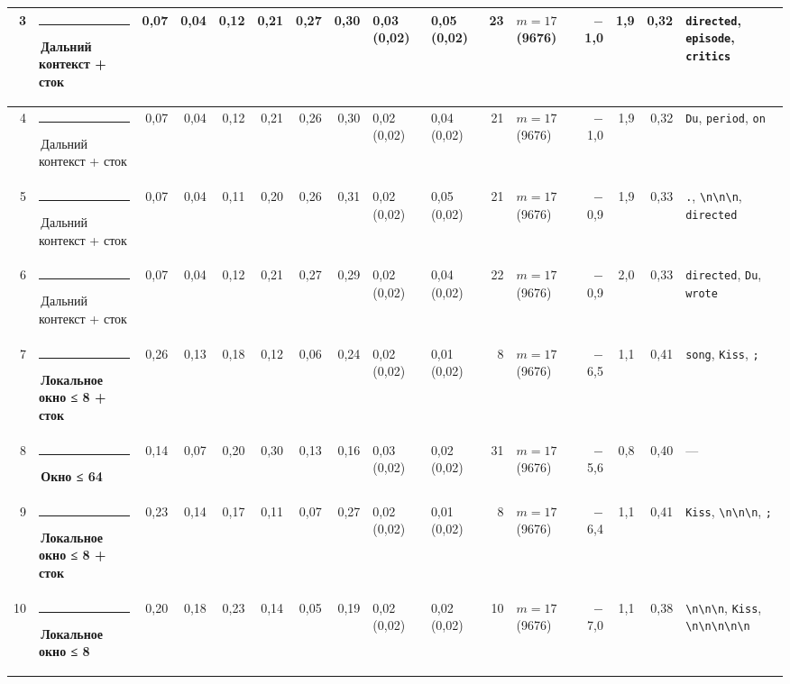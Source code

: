 \documentclass[10pt]{article}
\begin{document}
\begin{minipage}{\linewidth}
\begin{center}
{\begin{tabular}{|r|l|r|r|r|r|r|r|l|l|r|l|r|r|r|l|}
3 & \textcolor[HTML]{C3C2B7}{\rule{0.62em}{0.62em}}\,Дальний контекст + сток & 0,07 & 0,04 & 0,12 & 0,21 & 0,27 & 0,30 & 0,03 (0,02) & 0,05 (0,02) & 23 & $m{=}17$ (9676) & $-$1,0 & 1,9 & 0,32 & \texttt{\textvisiblespace{}directed}, \texttt{\textvisiblespace{}episode}, \texttt{\textvisiblespace{}critics} \\ \hline
4 & \textcolor[HTML]{C3C2B7}{\rule{0.62em}{0.62em}}\,Дальний контекст + сток & 0,07 & 0,04 & 0,12 & 0,21 & 0,26 & 0,30 & 0,02 (0,02) & 0,04 (0,02) & 21 & $m{=}17$ (9676) & $-$1,0 & 1,9 & 0,32 & \texttt{\textvisiblespace{}Du}, \texttt{\textvisiblespace{}period}, \texttt{\textvisiblespace{}on} \\ \hline
5 & \textcolor[HTML]{C3C2B7}{\rule{0.62em}{0.62em}}\,Дальний контекст + сток & 0,07 & 0,04 & 0,11 & 0,20 & 0,26 & 0,31 & 0,02 (0,02) & 0,05 (0,02) & 21 & $m{=}17$ (9676) & $-$0,9 & 1,9 & 0,33 & \texttt{\textvisiblespace{}.}, \texttt{\textvisiblespace{}\textbackslash{}n\textbackslash{}n\textbackslash{}n}, \texttt{\textvisiblespace{}directed} \\ \hline
6 & \textcolor[HTML]{C3C2B7}{\rule{0.62em}{0.62em}}\,Дальний контекст + сток & 0,07 & 0,04 & 0,12 & 0,21 & 0,27 & 0,29 & 0,02 (0,02) & 0,04 (0,02) & 22 & $m{=}17$ (9676) & $-$0,9 & 2,0 & 0,33 & \texttt{\textvisiblespace{}directed}, \texttt{\textvisiblespace{}Du}, \texttt{\textvisiblespace{}wrote} \\ \hline
7 & \textcolor[HTML]{1BAF7A}{\rule{0.62em}{0.62em}}\,\textbf{Локальное окно ≤ 8 + сток} & 0,26 & 0,13 & 0,18 & 0,12 & 0,06 & 0,24 & 0,02 (0,02) & 0,01 (0,02) & 8 & $m{=}17$ (9676) & $-$6,5 & 1,1 & 0,41 & \texttt{\textvisiblespace{}song}, \texttt{\textvisiblespace{}Kiss}, \texttt{\textvisiblespace{};} \\ \hline
8 & \textcolor[HTML]{EDA100}{\rule{0.62em}{0.62em}}\,\textbf{Окно ≤ 64} & 0,14 & 0,07 & 0,20 & 0,30 & 0,13 & 0,16 & 0,03 (0,02) & 0,02 (0,02) & 31 & $m{=}17$ (9676) & $-$5,6 & 0,8 & 0,40 & — \\ \hline
9 & \textcolor[HTML]{1BAF7A}{\rule{0.62em}{0.62em}}\,\textbf{Локальное окно ≤ 8 + сток} & 0,23 & 0,14 & 0,17 & 0,11 & 0,07 & 0,27 & 0,02 (0,02) & 0,01 (0,02) & 8 & $m{=}17$ (9676) & $-$6,4 & 1,1 & 0,41 & \texttt{\textvisiblespace{}Kiss}, \texttt{\textvisiblespace{}\textbackslash{}n\textbackslash{}n\textbackslash{}n}, \texttt{\textvisiblespace{};} \\ \hline
10 & \textcolor[HTML]{1BAF7A}{\rule{0.62em}{0.62em}}\,\textbf{Локальное окно ≤ 8} & 0,20 & 0,18 & 0,23 & 0,14 & 0,05 & 0,19 & 0,02 (0,02) & 0,02 (0,02) & 10 & $m{=}17$ (9676) & $-$7,0 & 1,1 & 0,38 & \texttt{\textvisiblespace{}\textbackslash{}n\textbackslash{}n\textbackslash{}n}, \texttt{\textvisiblespace{}Kiss}, \texttt{\textbackslash{}n\textbackslash{}n\textbackslash{}n\textbackslash{}n\textbackslash{}n} \\ \hline

\end{tabular}}
\end{center}
\end{minipage}
\end{document}

